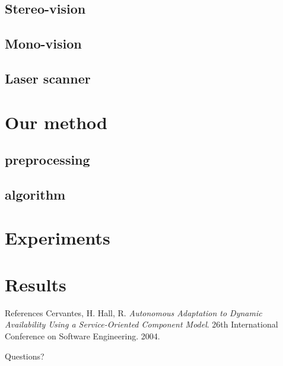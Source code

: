 \documentclass{beamer}
\begin{document}
\subsection{Stereo-vision}
\subsection{Mono-vision}
\subsection{Laser scanner}

\section{Our method}
\subsection{preprocessing}
\subsection{algorithm}

\section{Experiments}

\section{Results}

\begin{thebibliography}{9}

	\begin{frame}{References}
			Cervantes, H. Hall, R.
			\emph{Autonomous Adaptation to Dynamic Availability Using a Service-Oriented Component Model}.
			26th International Conference on Software Engineering.
			2004.
			
 	\end{frame}
 	
	\begin{frame}{}
	\begin{alertblock}{}
		\center
		Questions?
	\end{alertblock}
	\end{frame} 	
 	
\end{thebibliography}
 	
\end{document}
